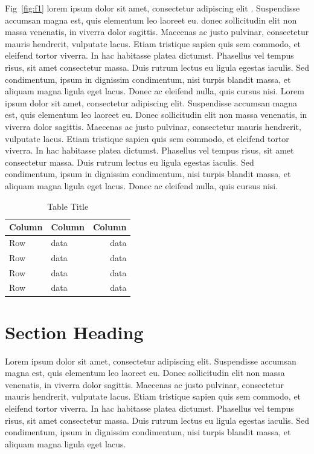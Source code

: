 \documentclass{winnower}
\begin{document}
Fig~\ref{fig:f1} lorem ipsum dolor sit amet, consectetur adipiscing elit \citep{AuthorYear}. Suspendisse accumsan magna est, quis elementum leo laoreet eu. \cite{Author2year2} donec sollicitudin elit non massa venenatis, in viverra dolor sagittis. Maecenas ac justo pulvinar, consectetur mauris hendrerit, vulputate lacus. Etiam tristique sapien quis sem commodo, et eleifend tortor viverra. In hac habitasse platea dictumst. Phasellus vel tempus risus, sit amet consectetur massa. Duis rutrum lectus eu ligula egestas iaculis. Sed condimentum, ipsum in dignissim condimentum, nisi turpis blandit massa, et aliquam magna ligula eget lacus. Donec ac eleifend nulla, quis cursus nisi. Lorem ipsum dolor sit amet, consectetur adipiscing elit. Suspendisse accumsan magna est, quis elementum leo laoreet eu. Donec sollicitudin elit non massa venenatis, in viverra dolor sagittis. Maecenas ac justo pulvinar, consectetur mauris hendrerit, vulputate lacus. Etiam tristique sapien quis sem commodo, et eleifend tortor viverra. In hac habitasse platea dictumst. Phasellus vel tempus risus, sit amet consectetur massa. Duis rutrum lectus eu ligula egestas iaculis. Sed condimentum, ipsum in dignissim condimentum, nisi turpis blandit massa, et aliquam magna ligula eget lacus. Donec ac eleifend nulla, quis cursus nisi.

\begin{table}[t]
\centering
\caption{Table Title}
\begin{tabular*}{ 0.5 \textwidth}{llr}
\hline
Column    & Column & Column \\
\hline
Row      & data    & data      \\
Row      & data    & data       \\
Row      & data    & data      \\
Row      & data    & data       \\
\hline
\end{tabular*}
\label{table:t1}
\end{table}


\section{Section Heading}

Lorem ipsum dolor sit amet, consectetur adipiscing elit. Suspendisse accumsan magna est, quis elementum leo laoreet eu. Donec sollicitudin elit non massa venenatis, in viverra dolor sagittis. Maecenas ac justo pulvinar, consectetur mauris hendrerit, vulputate lacus. Etiam tristique sapien quis sem commodo, et eleifend tortor viverra. In hac habitasse platea dictumst. Phasellus vel tempus risus, sit amet consectetur massa. Duis rutrum lectus eu ligula egestas iaculis. Sed condimentum, ipsum in dignissim condimentum, nisi turpis blandit massa, et aliquam magna ligula eget lacus.
\end{document}
